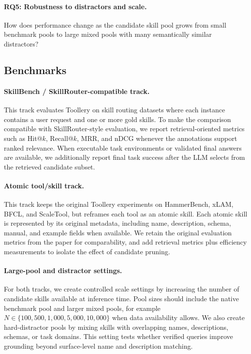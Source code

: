 \paragraph{RQ5: Robustness to distractors and scale.}
How does performance change as the candidate skill pool grows from small
benchmark pools to large mixed pools with many semantically similar distractors?

\subsection{Benchmarks}
\label{subsec:benchmarks}

\paragraph{SkillBench / SkillRouter-compatible track.}
This track evaluates Toollery on skill routing datasets where each instance
contains a user request and one or more gold skills. To make the comparison
compatible with SkillRouter-style evaluation, we report retrieval-oriented
metrics such as Hit@$k$, Recall@$k$, MRR, and nDCG whenever the annotations
support ranked relevance. When executable task environments or validated final
answers are available, we additionally report final task success after the LLM
selects from the retrieved candidate subset.

\paragraph{Atomic tool/skill track.}
This track keeps the original Toollery experiments on HammerBench, xLAM, BFCL,
and ScaleTool, but reframes each tool as an atomic skill. Each atomic skill is
represented by its original metadata, including name, description, schema,
manual, and example fields when available. We retain the original evaluation
metrics from the paper for comparability, and add retrieval metrics plus
efficiency measurements to isolate the effect of candidate pruning.

\paragraph{Large-pool and distractor settings.}
For both tracks, we create controlled scale settings by increasing the number of
candidate skills available at inference time. Pool sizes should include the
native benchmark pool and larger mixed pools, for example $N \in \{100, 500,
1{,}000, 5{,}000, 10{,}000\}$ when data availability allows. We also create
hard-distractor pools by mixing skills with overlapping names, descriptions,
schemas, or task domains. This setting tests whether verified queries improve
grounding beyond surface-level name and description matching.

